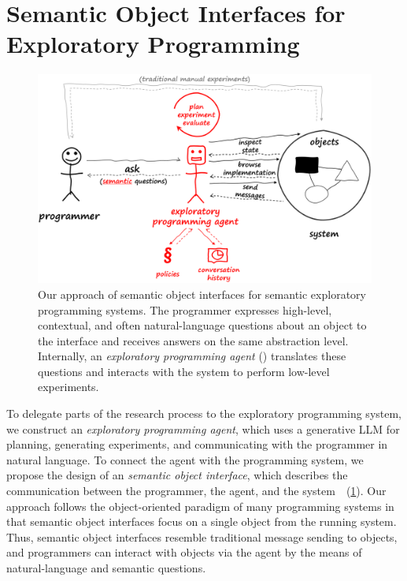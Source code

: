 
\section{Semantic Object Interfaces for Exploratory Programming}
\label{sec:design/agent}

\begin{figure}
	\centering
	\includegraphics[width=.9\textwidth]{03_agent/framework.png}
	\caption[Our approach of \emph{semantic object interfaces} for semantic exploratory programming systems.]{
		Our approach of semantic object interfaces for semantic exploratory programming systems.
		The programmer expresses high-level, contextual, and often natural-language questions about an object to the interface and receives answers on the same abstraction level.
		Internally, an \emph{exploratory programming agent} (\bold{\textcolor{red}{red}}) translates these questions and interacts with the system to perform low-level experiments.
	}
	\label{fig:design/agent/framework}
\end{figure}

To delegate parts of the research process to the exploratory programming system, we construct an \emph{exploratory programming agent}, which uses a generative LLM for planning, generating experiments, and communicating with the programmer in natural language.
To connect the agent with the programming system, we propose the design of an \emph{semantic object interface}, which describes the communication between the programmer, the agent, and the system~\cite{thiede2024talking}~(\cref{fig:design/agent/framework}).
Our approach follows the object-oriented paradigm of many programming systems in that semantic object interfaces focus on a single object from the running system.
Thus, semantic object interfaces resemble traditional message sending to objects, and programmers can interact with objects via the agent by the means of natural-language and semantic questions.


